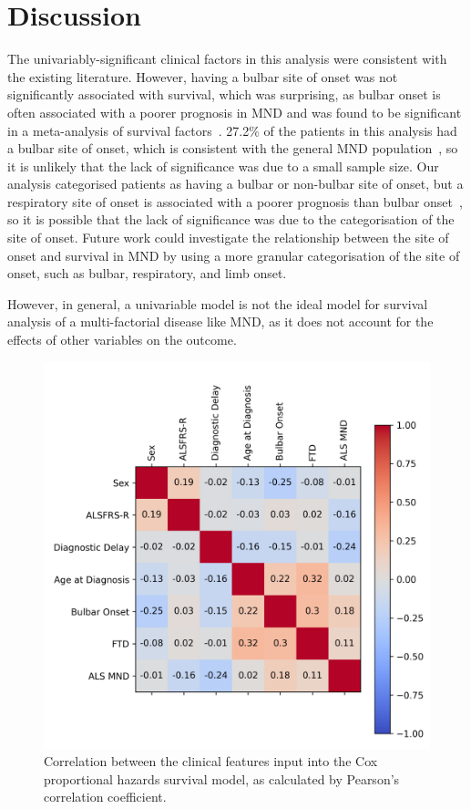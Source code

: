 \section{Discussion}


The univariably-significant clinical factors in this analysis were consistent with the existing literature.
However, having a bulbar site of onset was not significantly associated with survival, which was surprising, as bulbar onset is often associated with a poorer prognosis in MND and was found to be significant in a meta-analysis of survival factors~\cite{suPredictorsSurvivalPatients2021}.
27.2\% of the patients in this analysis had a bulbar site of onset, which is consistent with the general MND population~\cite{feldmanAmyotrophicLateralSclerosis2022}, so it is unlikely that the lack of significance was due to a small sample size.
Our analysis categorised patients as having a bulbar or non-bulbar site of onset, but a respiratory site of onset is associated with a poorer prognosis than bulbar onset~\cite{suPredictorsSurvivalPatients2021}, so it is possible that the lack of significance was due to the categorisation of the site of onset.
Future work could investigate the relationship between the site of onset and survival in MND by using a more granular categorisation of the site of onset, such as bulbar, respiratory, and limb onset.

However, in general, a univariable model is not the ideal model for survival analysis of a multi-factorial disease like MND, as it does not account for the effects of other variables on the outcome.

\begin{figure}
    \centering
    \includegraphics[width=0.75\linewidth]{figures/clinical_correlation}
    \caption{Correlation between the clinical features input into the Cox proportional hazards survival model, as calculated by Pearson's correlation coefficient.}
    \label{fig:clinicalcorrelation}
\end{figure}

